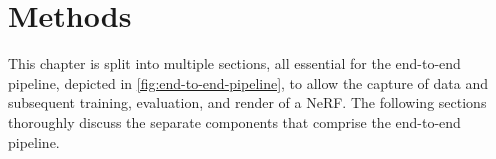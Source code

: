 \chapter{Methods}

This chapter is split into multiple sections, all essential for the end-to-end pipeline, depicted in \autoref{fig:end-to-end-pipeline}, to allow the capture of data and subsequent training, evaluation, and render of a NeRF. The following sections thoroughly discuss the separate components that comprise the end-to-end pipeline.




